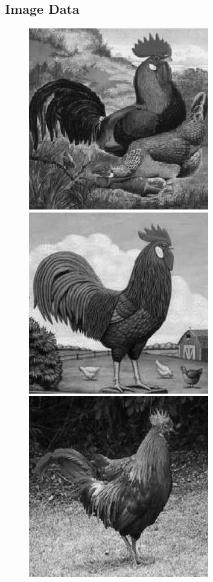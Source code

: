 \subsection{Image Data}
\begin{figure}
  \centering
      \includegraphics[scale=.2]{roosterrs-image_0001.jpg}
      \includegraphics[scale=.2]{roosterrs-image_0002.jpg}
      \includegraphics[scale=.2]{roosterrs-image_0003.jpg}

\end{figure}
